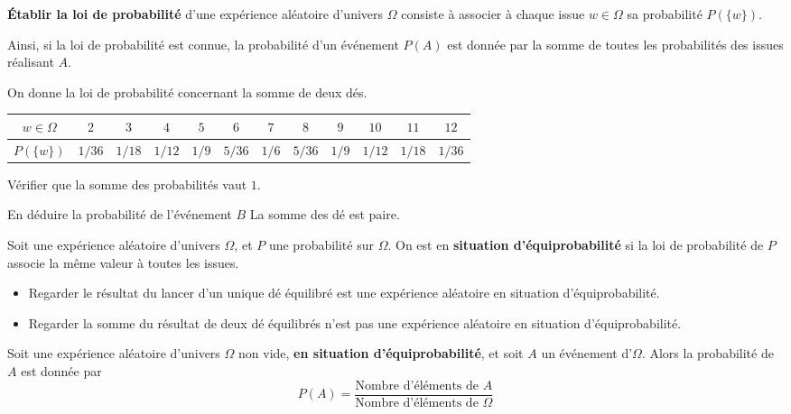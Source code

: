 \documentclass{article}
\begin{document}
\begin{definition}
\textbf{Établir la loi de probabilité} d'une expérience aléatoire d'univers $\Omega$ consiste à associer à chaque issue $w \in \Omega$ sa probabilité $P(\{w\})$.
\end{definition}
\begin{remark}
Ainsi, si la loi de probabilité est connue, la probabilité d'un événement $P(A)$ est donnée par la somme de toutes les probabilités des issues réalisant $A$.
\end{remark}
\begin{example}
On donne la loi de probabilité concernant la somme de deux dés.
\begin{center}
\begin{tabular}{|*{12}{c|}}
\hline
$w \in \Omega$ & $2$ & $3$ & $4$ & $5$ & $6$ & $7$ & $8$ & $9$ & $10$ & $11$ & $12$\\
\hline
$P(\{w\})$ & $1/36$ & $1/18$ & $1/12$ & $1/9$ & $5/36$ & $1/6$ & $5/36$ & $1/9$ & $1/12$ & $1/18$ & $1/36$\\
\hline
\end{tabular}
\end{center}
\begin{enumquestions}
\item Vérifier que la somme des probabilités vaut $1$. 
\item En déduire la probabilité de l'événement $B$ \og La somme des dé est paire\fg.
\end{enumquestions}
\vspace*{0.5cm}

\emptybox{2cm}
\end{example}
\begin{definition}
Soit une expérience aléatoire d'univers $\Omega$, et $P$ une probabilité sur $\Omega$. On est en \textbf{situation d'équiprobabilité} si la loi de probabilité de $P$ associe la même valeur à toutes les issues.
\end{definition}
\begin{example}
\hfill
\begin{itemize}
\item Regarder le résultat du lancer d'un unique dé équilibré est une expérience aléatoire en situation d'équiprobabilité.
\item Regarder la somme du résultat de deux dé équilibrés n'est pas une expérience aléatoire en situation d'équiprobabilité.
\end{itemize}
\end{example}
\begin{proposition}
Soit une expérience aléatoire d'univers $\Omega$ non vide, \textbf{en situation d'équiprobabilité}, et soit $A$ un événement d'$\Omega$. Alors la probabilité de $A$ est donnée par
\begin{equation*}
P(A) = \dfrac{\text{Nombre d'éléments de $A$}}{\text{Nombre d'éléments de $\Omega$}}
\end{equation*}
\end{proposition}
\end{document}
